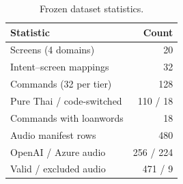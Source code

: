 \begin{table}[t]
\centering
\caption{Frozen dataset statistics.}
\label{tab:dataset}
\small
\begin{tabular}{lr}
\toprule
Statistic & Count \\
\midrule
Screens (4 domains) & 20 \\
Intent--screen mappings & 32 \\
Commands (32 per tier) & 128 \\
Pure Thai / code-switched & 110 / 18 \\
Commands with loanwords & 18 \\
Audio manifest rows & 480 \\
OpenAI / Azure audio & 256 / 224 \\
Valid / excluded audio & 471 / 9 \\
\bottomrule
\end{tabular}
\end{table}
